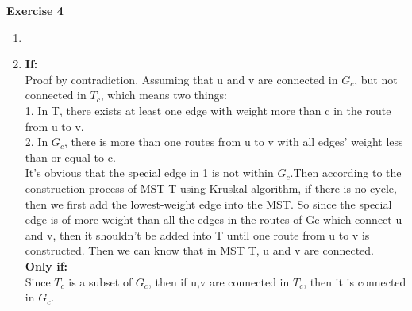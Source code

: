 \documentclass[12pt, notitlepage]{article}
\begin{document}
\textbf{Exercise 4}
\begin{enumerate}
\item
\item
\textbf{If:}\\
Proof by contradiction. Assuming that u and v are connected in $G_c$, but not connected in $T_c$, which means two things:\\
1. In T, there exists at least one edge with weight more than c in the route from u to v. \\
2. In $G_c$, there is more than one routes from u to v with all edges' weight less than or equal to c.\\
It's obvious that the special edge in 1 is not within $G_c$.Then according to the construction process of MST T using Kruskal algorithm,  if there is no cycle, then we first add the lowest-weight edge into the MST. So since the special edge is of more weight than all the edges in the routes of Gc which connect u and v, then it shouldn't be added into T until one route from u to v is constructed. Then we can know that in MST T, u and v are connected.\\
\textbf{Only if:}\\
Since $T_c$ is a subset of $G_c$, then if u,v are connected in $T_c$, then it is connected in $G_c$.
\end{enumerate}
\end{document}
